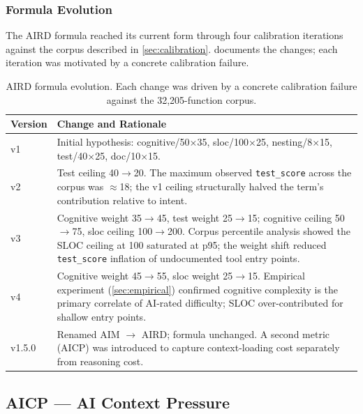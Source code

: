 \documentclass[10pt,twocolumn,letterpaper]{article}
\begin{document}
\subsubsection{Formula Evolution}

The AIRD formula reached its current form through four calibration
iterations against the corpus described in \cref{sec:calibration}.
 documents the changes; each iteration was
motivated by a concrete calibration failure.

\begin{table}[t]
\centering
\footnotesize
\begin{tabular}{@{}lp{7cm}@{}}
\toprule
\textbf{Version} & \textbf{Change and Rationale} \\
\midrule
v1 & Initial hypothesis: cognitive/50$\times$35, sloc/100$\times$25,
     nesting/8$\times$15, test/40$\times$25, doc/10$\times$15. \\
v2 & Test ceiling 40$\to$20.  The maximum observed \texttt{test\_score}
     across the corpus was $\approx$18; the v1 ceiling structurally
     halved the term's contribution relative to intent. \\
v3 & Cognitive weight 35$\to$45, test weight 25$\to$15; cognitive
     ceiling 50$\to$75, sloc ceiling 100$\to$200.  Corpus percentile
     analysis showed the SLOC ceiling at 100 saturated at p95; the
     weight shift reduced \texttt{test\_score} inflation of
     undocumented tool entry points. \\
v4 & Cognitive weight 45$\to$55, sloc weight 25$\to$15.  Empirical
     experiment (\cref{sec:empirical}) confirmed cognitive complexity
     is the primary correlate of AI-rated difficulty; SLOC
     over-contributed for shallow entry points. \\
v1.5.0 & Renamed AIM $\to$ AIRD; formula unchanged.  A second metric
          (AICP) was introduced to capture context-loading cost
          separately from reasoning cost. \\
\bottomrule
\end{tabular}
\caption{AIRD formula evolution.  Each change was driven by a concrete
calibration failure against the 32,205-function corpus.}
\label{tab:formula-history}
\end{table}

\subsection{AICP --- AI Context Pressure}
\end{document}
